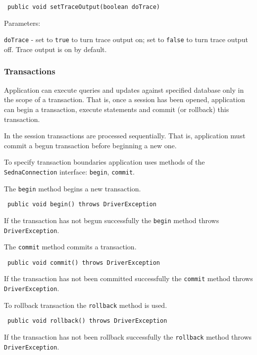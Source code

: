 \documentclass[a4paper,12pt]{article}
\begin{document}
\begin{verbatim}
 public void setTraceOutput(boolean doTrace)
\end{verbatim}

Parameters:

 \verb!doTrace! - set to \verb!true! to turn trace output on; set to \verb!false! to turn trace output off. Trace output is on by default.






\subsubsection{Transactions}
Application can execute queries and updates against specified database only in the scope of a transaction. That is, once a session has been opened, application can begin a transaction, execute statements and commit (or rollback) this transaction.

In the session transactions are processed sequentially. That is, application must commit a begun transaction before beginning a new one.

To specify transaction boundaries application uses methods of the \verb!SednaConnection! interface:
\verb!begin!, \verb!commit!.

The \verb!begin! method begins a new transaction.

\begin{verbatim}
 public void begin() throws DriverException
\end{verbatim}

If the transaction has not begun successfully the \verb!begin! method throws \verb!DriverException!.

The \verb!commit! method commits a transaction.

\begin{verbatim}
 public void commit() throws DriverException
\end{verbatim}

If the transaction has not been committed successfully the \verb!commit! method throws \verb!DriverException!.

To rollback transaction the \verb!rollback! method is used.

\begin{verbatim}
 public void rollback() throws DriverException
\end{verbatim}

If the transaction has not been rollback successfully the \verb!rollback! method throws \verb!DriverException!.
\end{document}
